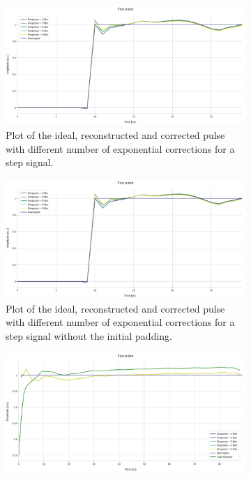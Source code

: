 \begin{figure}[h!]
    \centering
    \begin{subfigure}[t]{0.65\textwidth}
        \includegraphics[width=\textwidth]{figures/png/Cryoscope/filters/step_5_inverse.png}
        \caption{Plot of the ideal, reconstructed and corrected pulse with different number of exponential corrections for a step signal.}
        \label{fig:5inverse:step}
    \end{subfigure}
    \vspace{0.5cm}
    \begin{subfigure}[t]{0.65\textwidth}
        \includegraphics[width=\textwidth]{figures/png/Cryoscope/filters/step_5_inverse.png}
        \caption{Plot of the ideal, reconstructed and corrected pulse with different number of exponential corrections for a step signal without the initial padding.}
        \label{fig:5inverse:no_pad}
    \end{subfigure}
    \vspace{0.5cm}
    \begin{subfigure}[t]{0.65\textwidth}
        \includegraphics[width=\textwidth]{figures/png/Cryoscope/filters_long/5_inverse.png}

\end{subfigure}
\end{figure}
